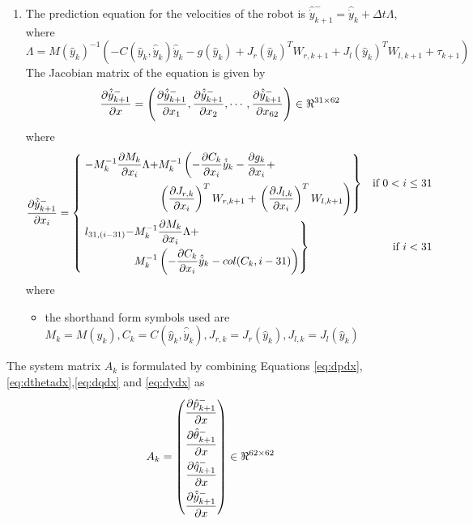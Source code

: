\begin{enumerate}
\item The prediction equation for the velocities of the robot is $\hat{\dot{y}}_{k+1}^- = \hat{\dot{y}}_{k}+ \Delta t \Lambda $, where 
$$\Lambda = M(\hat{y}_{k})^{-1}(-C(\hat{y}_{k},\hat{\dot{y}}_{k})\hat{\dot{y}}_{k} - g(\hat{y}_{k}) + J_r(\hat{y}_{k})^{T}W_{r,k+1} +J_l(\hat{y}_{k})^{T}W_{l,k+1} + \tau_{k+1})$$
The Jacobian matrix of the equation is given by
 \begin{equation}
 \label{eq:dydx}
\frac{\partial {\hat{\dot{y}}_{k+1}^-}}{\partial {x}} = \left(\frac{\partial {\hat{\dot{y}}_{k+1}^-}}{\partial {x_{1}}}, \frac{\partial {\hat{\dot{y}}_{k+1}^-}}{\partial {x_{2}}}, \cdots , \frac{\partial {\hat{\dot{y}}_{k+1}^-}}{\partial {x_{62}}}\right) \in \Re^{31 \times 62}
\end{equation}
where
\[
\frac{\partial {\hat{\dot{y}}_{k+1}^-}}{\partial {x_{i}}} = 
\left\{ 
\!\begin{aligned}
	& \left. \!\begin{aligned}
	-M_k^{-1}\frac{\partial {M_k}}{\partial {x_{i}}}\Lambda + &M_k^{-1}\left(-\frac{\partial {C_k}}{\partial {x_{i}}}\hat{\dot{y}}_{k} -\frac{\partial {g_k}}{\partial {x_{i}}}+ \right. \\
	&\left(\frac{\partial {J_{r,k}}}{\partial {x_{i}}}\right)^{T}W_{r,k+1} + \left. \left(\frac{\partial {J_{l,k}}}{\partial {x_{i}}}\right)^{T}W_{l,k+1} \right)
	\end{aligned} \right\}& \text{if } 0 < i \leq 31 \\
    & \left.\!\begin{aligned}
    l_{31,(i-31)}-&M_k^{-1}\frac{\partial {M_k}}{\partial {x_{i}}}\Lambda+ \\
    &M_k^{-1}\left(-\frac{\partial {C_k}}{\partial {x_{i}}}\hat{\dot{y}}_{k}- col(C_k,i-31)\right)     
    \end{aligned} \right\} & \text{if } i < 31  \\
\end{aligned}
\right.
\]where
\begin{itemize}
\item the shorthand form symbols used are  $M_k= M(\hat{y}_{k}),C_k=C(\hat{y}_{k},\hat{\dot{y}}_k),J_{r,k}=J_r(\hat{y}_{k}),J_{l,k}=J_l(\hat{y}_{k})$
\end{itemize}
\end{enumerate}
The system matrix $A_k$ is formulated by combining Equations \ref{eq:dpdx},\ref{eq:dthetadx},\ref{eq:dqdx} and \ref{eq:dydx} as
\begin{equation}
\label{eq:sys_mat}
A_k = \left(
\begin{aligned}
\frac{\partial {\hat{p}_{k+1}^-}}{\partial {x}} \\
\frac{\partial {\hat{\theta}_{k+1}^-}}{\partial {x}} \\
\frac{\partial {\hat{q}_{k+1}^-}}{\partial {x}}\\
\frac{\partial {\hat{\dot{y}}_{k+1}^-}}{\partial {x}}
\end{aligned} \right)
\in \Re^{62 \times 62}
\end{equation}

